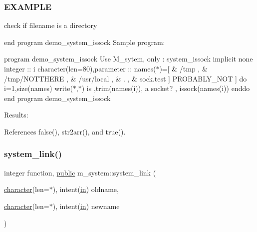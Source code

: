 \subsubsection*{E\+X\+A\+M\+P\+LE}

check if filename is a directory

end program demo\+\_\+system\+\_\+issock Sample program\+:

program demo\+\_\+system\+\_\+issock Use M\+\_\+sytem, only \+: system\+\_\+issock implicit none integer \+:\+: i character(len=80),parameter \+:\+: names($\ast$)=\mbox{[} \& \textquotesingle{}/tmp \textquotesingle{}, \& \textquotesingle{}/tmp/\+N\+O\+T\+T\+H\+E\+RE \textquotesingle{}, \& \textquotesingle{}/usr/local \textquotesingle{}, \& \textquotesingle{}. \textquotesingle{}, \& \textquotesingle{}sock.\+test \textquotesingle{}\mbox{]} \textquotesingle{}P\+R\+O\+B\+A\+B\+L\+Y\+\_\+\+N\+OT \textquotesingle{}\mbox{]} do i=1,size(names) write($\ast$,$\ast$)\textquotesingle{} is \textquotesingle{},trim(names(i)),\textquotesingle{} a socket? \textquotesingle{}, issock(names(i)) enddo end program demo\+\_\+system\+\_\+issock

Results\+: 

References false(), str2arr(), and true().

\mbox{\label{namespacem__system_aa77d9c9ae68750f515ba3d04d022c43c}} 
\subsubsection{\texorpdfstring{system\+\_\+link()}{system\_link()}}
{\footnotesize\ttfamily integer function, \hyperlink{M__stopwatch_83_8txt_a2f74811300c361e53b430611a7d1769f}{public} m\+\_\+system\+::system\+\_\+link (\begin{DoxyParamCaption}\item[{\hyperlink{option__stopwatch_83_8txt_abd4b21fbbd175834027b5224bfe97e66}{character}(len=$\ast$), intent(\hyperlink{M__journal_83_8txt_afce72651d1eed785a2132bee863b2f38}{in})}]{oldname,  }\item[{\hyperlink{option__stopwatch_83_8txt_abd4b21fbbd175834027b5224bfe97e66}{character}(len=$\ast$), intent(\hyperlink{M__journal_83_8txt_afce72651d1eed785a2132bee863b2f38}{in})}]{newname }\end{DoxyParamCaption})}



